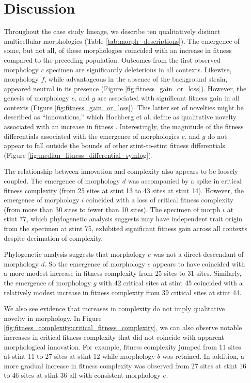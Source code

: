 \section{Discussion}

Throughout the case study lineage, we describe ten qualitatively distinct multicellular morphologies (Table \ref{tab:morph_descriptions}).
The emergence of some, but not all, of these morphologies coincided with an increase in fitness compared to the preceding population.
Outcomes from the first observed morphology $c$ specimen are significantly deleterious in all contexts.
Likewise, morphology $f$, while advantageous in the absence of the background strain, appeared neutral in its presence (Figure \ref{fig:fitness_gain_or_loss}).
However, the genesis of morphology $e$, and $g$ are associated with significant fitness gain in all contexts (Figure \ref{fig:fitness_gain_or_loss}).
This latter set of novelties might be described as ``innovations,'' which Hochberg et al. define as qualitative novelty associated with an increase in fitness \citep{hochberg2017innovation}.
Interestingly, the magnitude of the fitness differentials associated with the emergence of morphologies $e$, and $g$ do not appear to fall outside the bounds of other stint-to-stint fitness differentials (Figure \ref{fig:median_fitness_differential_symlog}).

The relationship between innovation and complexity also appears to be loosely coupled.
The emergence of morphology $d$ was accompanied by a spike in critical fitness complexity (from 25 sites at stint 13 to 43 sites at stint 14).
However, the emergence of morphology $i$ coincided with a loss of critical fitness complexity (from more than 30 sites to fewer than 10 sites).
The specimen of morph $i$ at stint 77, which phylogenetic analysis suggests may have independent trait origin from the specimen at stint 75, exhibited significant fitness gain across all contexts despite decimation of complexity.

Phylogenetic analysis suggests that morphology $e$ was not a direct descendant of morphology $d$.
So the emergence of morphology $e$ appears to have coincided with a more modest increase in fitness complexity from 25 sites to 31 sites.
Similarly, the emergence of morphology $g$ with 42 critical sites at stint 45 coincided with a relatively modest increase in fitness complexity from 39 critical sites at stint 44.

We also see evidence that increases in complexity do not imply qualitative novelty in morphology.
In Figure \ref{fig:fitness_complexity:critical_fitness_complexity}, we can also observe notable increases in critical fitness complexity that did not coincide with apparent morphological innovation.
For example, fitness complexity jumped from 11 sites at stint 11 to 27 sites at stint 12 while morphology $b$ was retained.
In addition, a more gradual increase in fitness complexity was observed from 27 sites at stint 16 to 46 sites at stint 36 all with consistent morphology $e$.

